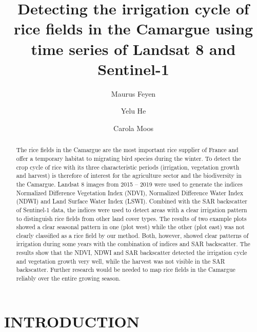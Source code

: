 \documentclass[a4paper, 10pt, conference]{ieeeconf}      %
\title{\huge \bf
Detecting the irrigation cycle of rice fields in the Camargue using time series of Landsat 8 and Sentinel-1
}
\author[ ]{Maurus Feyen}
\author[ ]{Yelu He}
\author[ ]{Carola Moos}
\affil[ ]{\textit{Remote Sensing Laboratories, Department of Geography, University of Zurich}}
\begin{document}


\maketitle
\thispagestyle{plain}
\pagestyle{plain}


\begin{abstract}

The rice fields in the Camargue are the most important rice supplier of France and offer a temporary habitat to migrating bird species during the winter. To detect the crop cycle of rice with its three characteristic periods (irrigation, vegetation growth and harvest) is therefore of interest for the agriculture sector and the biodiversity in the Camargue. Landsat 8 images from 2015 – 2019 were used to generate the indices Normalized Difference Vegetation Index (NDVI), Normalized Difference Water Index (NDWI) and Land Surface Water Index (LSWI). Combined with the SAR backscatter of Sentinel-1 data, the indices were used to detect areas with a clear irrigation pattern to distinguish rice fields from other land cover types. The results of two example plots showed a clear seasonal pattern in one (plot west) while the other (plot east) was not clearly classified as a rice field by our method. Both, however, showed clear patterns of irrigation during some years with the combination of indices and SAR backscatter. The results show that the NDVI, NDWI and SAR backscatter detected the irrigation cycle and vegetation growth very well, while the harvest was not visible in the SAR backscatter. Further research would be needed to map rice fields in the Camargue reliably over the entire growing season.


\end{abstract}


\section{INTRODUCTION}
\end{document}
